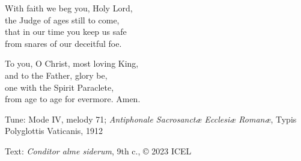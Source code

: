 \hymn



\begin{underhymnverse}
With faith we beg you, Holy Lord,\\
the Judge of ages still to come,\\
that in our time you keep us safe\\
from snares of our deceitful foe.

To you, O Christ, most loving King,\\
and to the Father, glory be,\\
one with the Spirit Paraclete,\\
from age to age for evermore. Amen.
\end{underhymnverse}



\begin{hymnsource}
Tune: Mode IV, melody 71; \emph{Antiphonale Sacrosanctæ Ecclesiæ Romanæ}, Typis Polyglottis Vaticanis, 1912

Text: \emph{Conditor alme siderum}, 9th c., © 2023 ICEL

\end{hymnsource}
